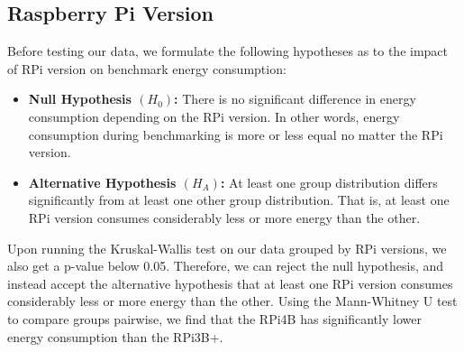 \subsection*{Raspberry Pi Version}
Before testing our data, we formulate the following hypotheses as to the impact of RPi version on benchmark energy consumption:

\begin{itemize}[label={}]
    \item \textbf{Null Hypothesis $(H_0)$:}
    There is no significant difference in energy consumption depending on the RPi version. In other words, energy consumption during benchmarking is more or less equal no matter the RPi version.
    \item \textbf{Alternative Hypothesis $(H_A)$:} At least one group distribution differs significantly from at least one other group distribution. That is, at least one RPi version consumes considerably less or more energy than the other.
\end{itemize}

Upon running the Kruskal-Wallis test on our data grouped by RPi versions, we also get a p-value below 0.05. Therefore, we can reject the null hypothesis, and instead accept the alternative hypothesis that at least one RPi version consumes considerably less or more energy than the other. Using the Mann-Whitney U test to compare groups pairwise, we find that the RPi4B has significantly lower energy consumption than the RPi3B+.
